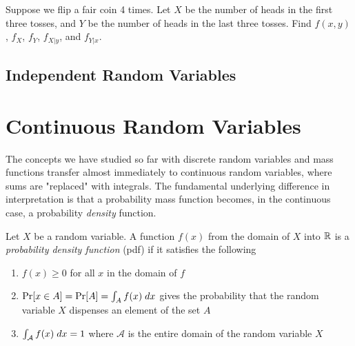 \documentclass[../main.tex]{subfiles}
\begin{document}
\begin{example}
Suppose we flip a fair coin 4 times. Let $X$ be the number of heads in the first three tosses, and $Y$ be the number of heads in the last three tosses. Find $f(x,y)$, $f_X$, $f_Y$, $f_{X|y}$, and $f_{Y|x}$. 
\end{example}

\subsection{Independent Random Variables}

\section{Continuous Random Variables}
The concepts we have studied so far with discrete random variables and mass functions transfer
almost immediately to continuous random variables, where sums are "replaced" with integrals. The fundamental underlying difference in interpretation is that a probability mass function becomes, in the continuous case, a probability \textit{density} function.

\begin{definition}
Let $X$ be a random variable. A function $f(x)$ from the domain of $X$ into $\mathbb{R}$ is a \textit{probability density function} (pdf) if it satisfies the following
\begin{enumerate}
    \item $f(x) \geq 0$ for all $x$ in the domain of $f$
    \item $\mathrm{Pr}[x \in A] = \mathrm{Pr}[A] = \int_A f(x) \;dx$ gives the probability
    that the random variable $X$ dispenses an element of the set $A$
    \item $\int_\mathcal{A} f(x) \;dx = 1$ where $\mathcal{A}$ is the entire domain
    of the random variable $X$
\end{enumerate}
\end{definition}
\end{document}
